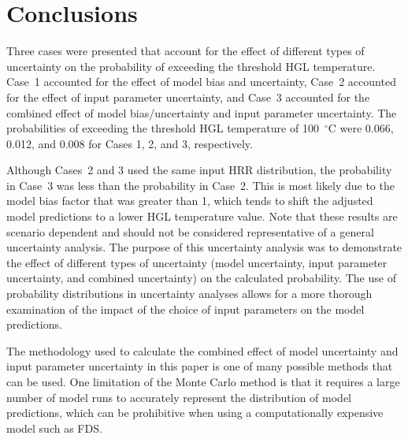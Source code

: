 \documentclass[12pt]{article}
\begin{document}
\clearpage


\section{Conclusions}
\label{sec:conclusions}

Three cases were presented that account for the effect of different types of uncertainty on the probability of exceeding the threshold HGL temperature. Case~1 accounted for the effect of model bias and uncertainty, Case~2 accounted for the effect of input parameter uncertainty, and Case~3 accounted for the combined effect of model bias/uncertainty and input parameter uncertainty. The probabilities of exceeding the threshold HGL temperature of 100~$^\circ$C were 0.066, 0.012, and 0.008 for Cases 1, 2, and 3, respectively.

Although Cases~2 and 3 used the same input HRR distribution, the probability in Case~3 was less than the probability in Case~2. This is most likely due to the model bias factor that was greater than 1, which tends to shift the adjusted model predictions to a lower HGL temperature value. Note that these results are scenario dependent and should not be considered representative of a general uncertainty analysis. The purpose of this uncertainty analysis was to demonstrate the effect of different types of uncertainty (model uncertainty, input parameter uncertainty, and combined uncertainty) on the calculated probability. The use of probability distributions in uncertainty analyses allows for a more thorough examination of the impact of the choice of input parameters on the model predictions.

The methodology used to calculate the combined effect of model uncertainty and input parameter uncertainty in this paper is one of many possible methods that can be used. One limitation of the Monte Carlo method is that it requires a large number of model runs to accurately represent the distribution of model predictions, which can be prohibitive when using a computationally expensive model such as FDS.




\end{document}
